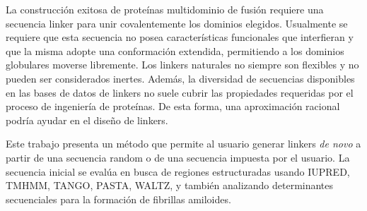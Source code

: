 




La construcción exitosa de proteínas multidominio de fusión requiere una secuencia linker para unir covalentemente los dominios elegidos.
Usualmente se requiere que esta secuencia no posea características funcionales que interfieran 
y que la misma adopte una conformación extendida, permitiendo a los dominios globulares moverse libremente.
Los linkers naturales no siempre son flexibles y no pueden ser considerados inertes. 
Además, la diversidad de secuencias disponibles en las bases de datos de linkers no suele cubrir las propiedades requeridas por el proceso de ingeniería de proteínas.
De esta forma, una aproximación racional podría ayudar en el diseño de linkers.






Este trabajo presenta un método que permite al usuario generar linkers \textit{de novo} a partir de una secuencia random o de una secuencia impuesta por el usuario.
La secuencia inicial se evalúa en busca de regiones estructuradas usando IUPRED, TMHMM, TANGO, PASTA, WALTZ, 
y también analizando determinantes secuenciales para la formación de fibrillas amiloides.




